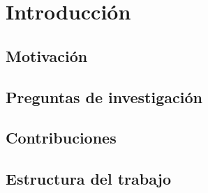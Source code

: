 \chapter{Introducci\'on}
\label{ch:intro}

\section{Motivaci\'on}
\label{sec:motivacion}

\section{Preguntas de investigaci\'on}
\label{sec:rq}

\section{Contribuciones}
\label{sec:contribuciones}

\section{Estructura del trabajo}
\label{sec:estructura}
